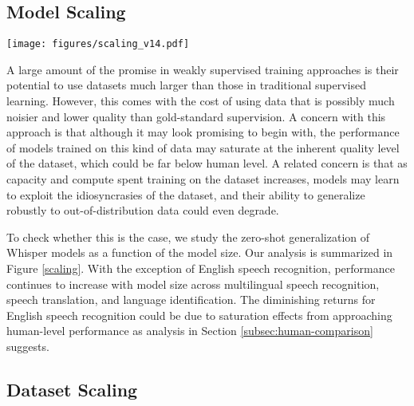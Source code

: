 \documentclass[nohyperref]{article}
\theoremstyle{plain}
\theoremstyle{definition}
\theoremstyle{remark}
\begin{document}
\subsection{Model Scaling}

\begin{figure*}[t]
\begin{center}
\centerline{\texttt{[image: figures/scaling\_v14.pdf]}}
\caption{\textbf{Zero-shot Whisper performance scales reliably across tasks and languages with increasing model size.} Lightly shaded lines represent individual datasets or languages, showing that performance is more varied than the smooth trends in aggregate performance. Large V2 distinguished with a dashed orange line since it includes several changes that are not present for the smaller models in this analysis.}
\label{scaling}
\end{center}
\vspace{-1em}
\end{figure*}

A large amount of the promise in weakly supervised training approaches is their potential to use datasets much larger than those in traditional supervised learning. However, this comes with the cost of using data that is possibly much noisier and lower quality than gold-standard supervision. A concern with this approach is that although it may look promising to begin with, the performance of models trained on this kind of data may saturate at the inherent quality level of the dataset, which could be far below human level. A related concern is that as capacity and compute spent training on the dataset increases, models may learn to exploit the idiosyncrasies of the dataset, and their ability to generalize robustly to out-of-distribution data could even degrade. 

To check whether this is the case, we study the zero-shot generalization of Whisper models as a function of the model size. Our analysis is summarized in Figure \ref{scaling}. With the exception of English speech recognition, performance continues to increase with model size across multilingual speech recognition, speech translation, and language identification. The diminishing returns for English speech recognition could be due to saturation effects from approaching human-level performance as analysis in Section \ref{subsec:human-comparison} suggests.

\subsection{Dataset Scaling}
\end{document}
